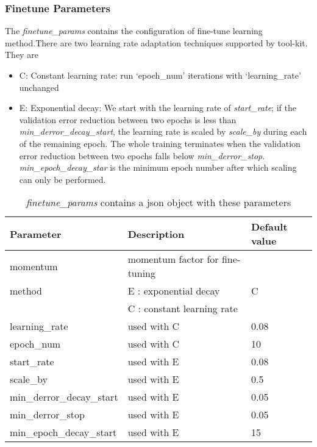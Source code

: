 \subsubsection{Finetune Parameters}
\label{subsec:finetuneparam}
The \emph{finetune\_params} contains the configuration of fine-tune learning method.There are two learning rate adaptation techniques supported by tool-kit.  They are
\begin{itemize}
\item C: Constant learning rate: run `epoch\_num' iterations with `learning\_rate' unchanged
\item E: Exponential decay: We start with the learning rate of \emph{start\_rate}; if the validation error reduction between two epochs is less than \emph{min\_derror\_decay\_start}, the learning rate is scaled by \emph{scale\_by} during each of the remaining epoch.  The whole training terminates when the validation error reduction between two epochs falls below \emph{min\_derror\_stop}. \emph{min\_epoch\_decay\_star} is the minimum epoch number after which scaling can only be performed.
\end{itemize}
\begin{table}[h]
\centering
\caption[]{\textit{finetune\_params} contains a json object with these parameters}
\begin{tabular}{|l|l|l|}
\hline
\textbf{Parameter}	& \textbf{Description} 				& \textbf{Default value}\\  \hline
momentum 			& momentum factor for fine-tuning 	& \\
method 				& E : exponential decay 			    & C\\
					& C : constant learning rate 		& \\
learning\_rate   	& used with C 						& 0.08\\
epoch\_num          & used with C 			 			& 10\\
start\_rate         & used with E 						& 0.08 \\
scale\_by           & used with E 						& 0.5\\
min\_derror\_decay\_start& used with E 					& 0.05\\
min\_derror\_stop   & used with E 						& 0.05 \\
min\_epoch\_decay\_start  & used with E 					& 15\\
\hline
\end{tabular}
\end{table}

\clearpage

